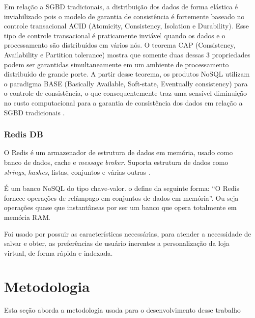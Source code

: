 \documentclass[a4paper,12pt]{monografia}
\begin{document}
Em relação a SGBD tradicionais, a distribuição dos dados de forma elástica é inviabilizado pois o modelo de garantia de consistência é fortemente baseado no controle transacional ACID (Atomicity, Consistency, Isolation e Durability). Esse tipo de controle transacional é praticamente inviável quando os dados e o processamento são distribuídos em vários nós. O teorema CAP (Consistency, Availability e Partition tolerance) mostra que somente duas dessas 3 propriedades podem ser garantidas simultaneamente em um ambiente de processamento distribuído de grande porte. A partir desse teorema, os produtos NoSQL utilizam o paradigma BASE (Basically Available, Soft-state, Eventually consistency) para o controle de consistência, o que consequentemente traz uma sensível diminuição no custo computacional para a garantia de consistência dos dados em relação a SGBD tradicionais \cite{vieira2012bancos}.


\subsection{Redis DB} %
\label{sub:redis_db}

O Redis é um armazenador de estrutura de dados em memória, usado como banco de dados, cache e \textit{message broker}. Suporta estrutura de dados como \textit{strings}, \textit{hashes}, listas, conjuntos e várias outras \cite{redis}.

É um banco NoSQL do tipo chave-valor.  o define da seguinte forma:  ``O Redis fornece operações de relâmpago em conjuntos de dados em memória''. Ou seja operações quase que instantâneas por ser um banco que opera totalmente em memória RAM.

Foi usado por possuir as características necessárias, para atender a necessidade de salvar e obter, as preferências de usuário inerentes a personalização da loja virtual, de forma rápida e indexada.



\chapter{Metodologia} %
\label{cha:metodologia}

Esta seção aborda a metodologia usada para o desenvolvimento desse trabalho
\end{document}
